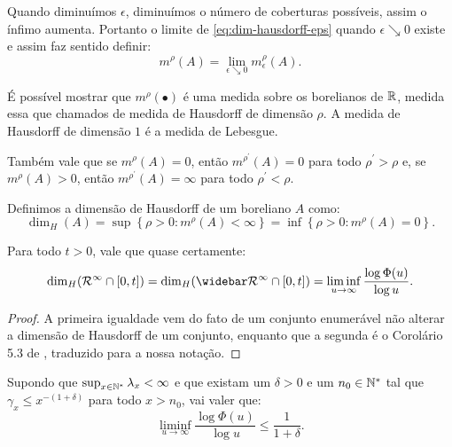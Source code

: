 Quando diminuímos $\epsilon$, diminuímos o número de coberturas
possíveis, assim o ínfimo aumenta. Portanto o limite de
\eqref{eq:dim-hausdorff-eps} quando $\epsilon \searrow 0$ existe e
assim faz sentido definir:
\begin{displaymath}
  m^\rho(A) = \lim_{\epsilon \searrow 0} m^\rho_\epsilon (A).
\end{displaymath}

É possível mostrar que $m^\rho(\bullet)$ é uma medida sobre os
borelianos de ${\mathbb{R}}$, medida essa que chamados de medida de Hausdorff de
dimensão $\rho$.  A medida de Hausdorff de dimensão $1$ é a medida de
Lebesgue.

Também vale que se $m^\rho(A) = 0$, então $m^{\rho^\prime}(A) = 0$ para
todo $\rho^\prime > \rho$ e, se $m^\rho(A) > 0$, então $m^{\rho^\prime}(A)
= \infty$ para todo $\rho^\prime < \rho$.

\begin{definicao}
  Definimos a dimensão de Hausdorff de um boreliano $A$ como:
  \begin{displaymath}
    \dim_H(A) = \sup \left\{ \rho > 0 : m^\rho(A) < \infty \right\}
    = \inf \left\{ \rho > 0: m^\rho(A) = 0 \right\}.
  \end{displaymath}
\end{definicao}

\begin{teorema}
  \label{teo:dim-hausdorff}
  Para todo $t > 0$, vale que quase certamente:
  \begin{equation}
    \label{eq:dim-hausdorff}
    \dim_H(\RR^\infty \cap [0, t]) = 
    \dim_H(\RRb^\infty \cap [0, t]) =
    \liminf_{u \to \infty} \frac{\log \Phi(u)}{\log u}.
  \end{equation}
\end{teorema}
\begin{proof}
  A primeira igualdade vem do fato de um conjunto enumerável não
  alterar a dimensão de Hausdorff de um conjunto, enquanto que a
  segunda é o Corolário 5.3 de \cite{bertoin:97}, traduzido para a
  nossa notação.
\end{proof}

\begin{proposicao}
  \label{prop:dominar-dim-haus-sup}
  Supondo que $\sup_{x\in{\mathbb{N^*}}}\lambda_x < \infty$ e que existam um
  $\delta>0$ e um $n_0 \in {\mathbb{N^*}}$ tal que $\gamma_x \leq x^{-(1+\delta)}$
  para todo $x > n_0$, vai valer que:
  \begin{equation}
    \liminf_{u \to \infty} \frac{\log \Phi(u)}{\log u}  \leq
    \frac{1}{1+\delta} .
  \end{equation}
\end{proposicao}

